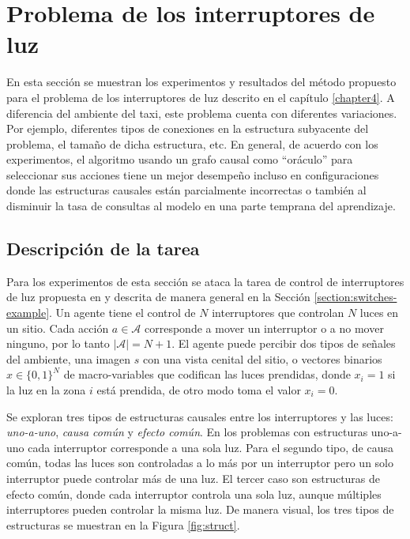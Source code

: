 \section{Problema de los interruptores de luz}

En esta sección se muestran los experimentos y resultados del método propuesto para
el problema de los interruptores de luz descrito en el capítulo \ref{chapter4}.
A diferencia del ambiente del taxi, este problema cuenta 
con diferentes variaciones. Por ejemplo,
diferentes tipos de conexiones en la estructura subyacente del problema, el tamaño de dicha estructura, etc.
En general, de acuerdo con los experimentos, el algoritmo usando un grafo causal como ``oráculo'' para seleccionar sus acciones tiene un mejor desempeño incluso en 
configuraciones donde las estructuras causales están parcialmente incorrectas o también 
al disminuir la tasa de consultas al modelo en una parte temprana del aprendizaje.


\subsection{Descripción de la tarea}
Para los experimentos de esta sección se ataca la tarea de control de interruptores de luz propuesta en \cite{nair2019causal} y descrita de manera general en la Sección \ref{section:switches-example}. Un agente tiene el control
de $N$ interruptores que controlan $N$ luces en un sitio.
Cada acción $a\in \mathcal{A}$ corresponde a mover un interruptor o 
a no mover ninguno, por lo tanto $|\mathcal{A}| = N + 1$.
El agente puede percibir dos tipos de señales del ambiente,
una imagen $s$ con una vista cenital del sitio, o vectores binarios $x \in \{0,1\}^N$ de 
macro-variables que codifican las luces prendidas, donde
$x_i = 1$ si la luz en la zona $i$ está prendida, de otro modo 
toma el valor $x_i = 0$.

Se exploran tres tipos de estructuras causales entre los
interruptores y las luces: \textit{uno-a-uno},
\textit{causa común} y \textit{efecto común}.
En los problemas con estructuras uno-a-uno cada interruptor corresponde a una sola luz.
Para el segundo tipo, de causa común, todas
las luces son controladas a lo más por un interruptor pero un
solo interruptor puede controlar más de una luz.
El tercer caso son estructuras de efecto común, donde cada interruptor
controla una sola luz, aunque múltiples interruptores
pueden controlar la misma luz. De manera visual, los tres tipos de estructuras
se muestran en la Figura \ref{fig:struct}.

